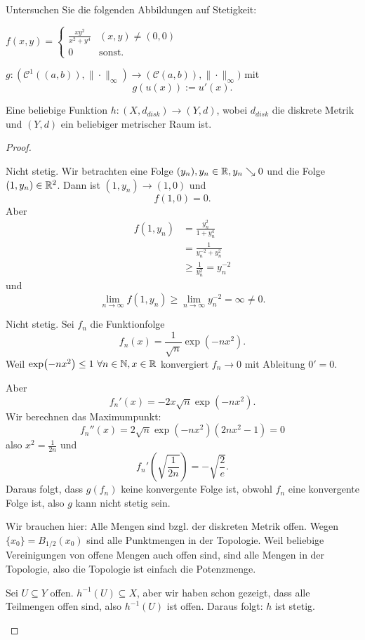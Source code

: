 \begin{Problem}
	Untersuchen Sie die folgenden Abbildungen auf Stetigkeit:
	\begin{parts}
		\item $f(x,y)=\begin{cases}
				\frac{xy^2}{x^2+y^4} & (x,y)\neq (0,0)\\
				0 & \text{sonst.}
		\end{cases}$ 
	\item $g:(\mathcal{C}^1((a,b)),\|\cdot\|_\infty)\to (\mathcal{C}(a,b)),\|\cdot\|_\infty)$ mit
		\[
		g(u(x)):=u'(x)
		.\] 
	\item Eine beliebige Funktion $h:(X,d_{disk})\to (Y,d)$, wobei $d_{disk}$ die diskrete Metrik und $(Y,d)$ ein beliebiger metrischer Raum ist.
	\end{parts}
\end{Problem}
\begin{proof}
	\begin{parts}
	\item Nicht stetig. Wir betrachten eine Folge $(y_n), y_n\in \mathbb{R}, y_n\searrow 0$ und die Folge $(1,y_n)\in \mathbb{R}^2$. Dann ist $(1,y_n)\to (1,0)$ und
	\[
	f(1,0)=0
	.\] 
	Aber
	\begin{align*}
		f(1,y_n)&=\frac{y_n^2}{1+y_n^4}\\
			&=\frac{1}{y_n^{-2}+y_n^2}\\
			&\ge \frac{1}{y^{2}_n}=y^{-2}_n
	\end{align*}
	und
	\[
		\lim_{n \to \infty} f(1,y_n)\ge \lim_{n \to \infty} y_n^{-2}=\infty\neq 0
	.\]
\item Nicht stetig. Sei $f_n$ die Funktionfolge
	\[
	f_n(x)=\frac{1}{\sqrt{n} }\exp(-nx^2)
	.\] 
	Weil $\exp(-nx^2)\le 1~\forall n\in \mathbb{N},x\in \mathbb{R}$ konvergiert $f_n\to 0$ mit Ableitung $0'=0$. 

	Aber
	\[
	f_n'(x)=-2x\sqrt{n}\exp(-nx^2)
	.\] 
	Wir berechnen das Maximumpunkt:
	\[
	f_n''(x)=2\sqrt{n} \exp(-nx^2)(2nx^2-1)=0
\]
also $x^2=\frac{1}{2n}$ und
\[
f_n'\left( \sqrt{\frac{1}{2n}}  \right) =-\sqrt{\frac{2}{e}} 
.\] 
Daraus folgt, dass $g(f_n)$ keine konvergente Folge ist, obwohl $f_n$ eine konvergente Folge ist, also $g$ kann nicht stetig sein.
\item Wir brauchen hier: Alle Mengen sind bzgl. der diskreten Metrik offen. Wegen $\{x_0\} =B_{1 / 2}(x_0)$ sind alle Punktmengen in der Topologie. Weil beliebige Vereinigungen von offene Mengen auch offen sind, sind alle Mengen in der Topologie, also die Topologie ist einfach die Potenzmenge.

	Sei $U\subseteq Y$ offen. $h^{-1}(U)\subseteq X$, aber wir haben schon gezeigt, dass alle Teilmengen offen sind, also $h^{-1}(U)$ ist offen. Daraus folgt: $h$ ist stetig.\qedhere
\end{parts}
\end{proof}

